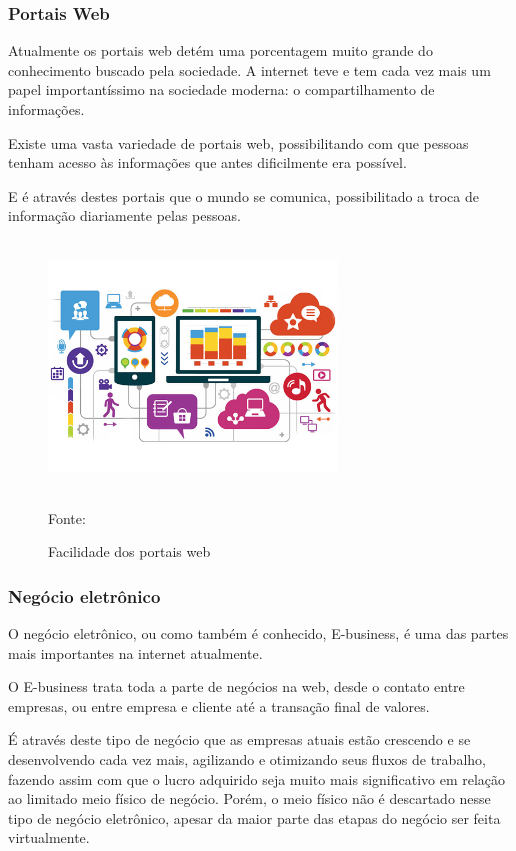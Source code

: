 \subsubsection{Portais Web}

Atualmente os portais web detém uma porcentagem muito grande do conhecimento buscado pela sociedade. A internet teve e tem cada vez mais um papel importantíssimo na sociedade moderna: o compartilhamento de informações.

Existe uma vasta variedade de portais web, possibilitando com que pessoas tenham acesso às informações que antes dificilmente era possível.

E é através destes portais que o mundo se comunica, possibilitado a troca de informação diariamente pelas pessoas.

 \begin{figure}[!h]
	\centering
	\caption{Facilidade dos portais web}
	\includegraphics[width=290px, height=250px]{./images/2-5.png}
	\par{Fonte: \cite{newtechs}}
\end{figure}

\subsubsection{Negócio eletrônico}

O negócio eletrônico, ou como também é conhecido, E-business, é uma das partes mais importantes na internet atualmente.

O E-business trata toda a parte de negócios na web, desde o contato entre empresas, ou entre empresa e cliente até a transação final de valores.

É através deste tipo de negócio que as empresas atuais estão crescendo e se desenvolvendo cada vez mais, agilizando e otimizando seus fluxos de trabalho, fazendo assim com que o lucro adquirido seja muito mais significativo em relação ao limitado meio físico de negócio. Porém, o meio físico não é descartado nesse tipo de negócio eletrônico, apesar da maior parte das etapas do negócio ser feita virtualmente.

